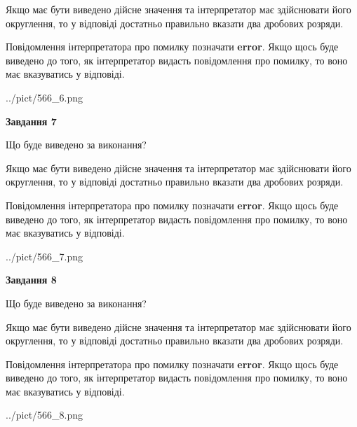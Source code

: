 \documentclass[12pt, ukrainian]{article}
\begin{document}
{\begin {Large}
Якщо має бути виведено дійсне значення та інтерпретатор має здійснювати його округлення, 
то у відповіді достатньо правильно вказати два дробових розряди.

Повідомлення інтерпретатора про помилку позначати \textbf{error}.
Якщо щось буде виведено до того, як інтерпретатор видасть повідомлення про помилку, 
то воно має вказуватись у відповіді. \par

\begin{center}
	{../pict/566_6.png}
\end{center}
\newpage

{\begin {center}\textbf{Завдання 7}\end {center}}\par
Що буде виведено за виконання? \par

Якщо має бути виведено дійсне значення та інтерпретатор має здійснювати його округлення, 
то у відповіді достатньо правильно вказати два дробових розряди.

Повідомлення інтерпретатора про помилку позначати \textbf{error}.
Якщо щось буде виведено до того, як інтерпретатор видасть повідомлення про помилку, 
то воно має вказуватись у відповіді. \par

\begin{center}
	{../pict/566_7.png}
\end{center}
\newpage

{\begin {center}\textbf{Завдання 8}\end {center}}\par
Що буде виведено за виконання? \par

Якщо має бути виведено дійсне значення та інтерпретатор має здійснювати його округлення, 
то у відповіді достатньо правильно вказати два дробових розряди.

Повідомлення інтерпретатора про помилку позначати \textbf{error}.
Якщо щось буде виведено до того, як інтерпретатор видасть повідомлення про помилку, 
то воно має вказуватись у відповіді. \par

\begin{center}
	{../pict/566_8.png}
\end{center}
\newpage


\end{Large}}
\end{document}
